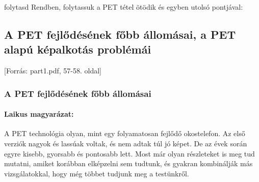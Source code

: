 \documentclass[a4paper,12pt]{article}
\begin{document}
folytasd
Rendben, folytassuk a PET tétel ötödik és egyben utolsó pontjával:

\subsection{A PET fejlődésének főbb állomásai, a PET alapú képalkotás problémái} [Forrás: part1.pdf, 57-58. oldal]

\subsubsection{A PET fejlődésének főbb állomásai}

\paragraph{Laikus magyarázat:} A PET technológia olyan, mint egy folyamatosan fejlődő okostelefon. Az első verziók nagyok és lassúak voltak, és nem adtak túl jó képet. De az évek során egyre kisebb, gyorsabb és pontosabb lett. Most már olyan részleteket is meg tud mutatni, amiket korábban elképzelni sem tudtunk, és gyakran kombinálják más vizsgálatokkal, hogy még többet tudjunk meg a testünkről.
\end{document}
